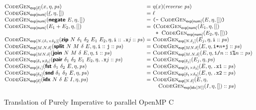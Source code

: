 \begin{figure}[H]
  \begin{minipage}{1.0\linewidth}
    \begin{displaymath}
      \begin{array}{@{}l@{~}c@{~}l@{}}
        \codegenExp{\delta}{x, \eta, \mathit{ps}}
        &=& \eta(x)(\mathit{reverse}~\mathit{ps})
        \\
        \codegenExp{\num}{\underline{\ell}, \eta, []}
        &=& \ell
        \\
        \codegenExp{\num}{\prim{negate}~E, \eta, []}
        &=& \texttt{(}\texttt{-}~\codegenExp{\num}{E, \eta, []}\texttt{)}
        \\
        \codegenExp{\num}{E_1 + E_2, \eta, []}
        &=& \texttt{(}
        \begin{array}[t]{@{}l}
          \codegenExp{\num}{E_1, \eta, []}\\
          \texttt{+ }\codegenExp{\num}{E_2, \eta, []}\texttt{)}
        \end{array}
        \\
        \codegenExp{N.(\delta_1 \times \delta_2)}{\prim{zip}~N~\delta_1~\delta_2~E_1~E_2, \eta, \texttt{i} :: \texttt{.x}j :: \mathit{ps}}
        &=& \codegenExp{N.\delta_j}{E_j, \eta, \texttt{i} :: \mathit{ps}}
        \\
        \codegenExp{M.N.\delta}{\prim{split}~N~M~\delta~E, \eta, \texttt{i} :: \texttt{j} :: \mathit{ps}}
        &=& \codegenExp{MN.\delta}{E, \eta, \texttt{i*}n\texttt{+j} :: \mathit{ps}}
        \\
        \codegenExp{MN.\delta}{\prim{join}~N~M~\delta~E, \eta, \texttt{i} :: \mathit{ps}}
        &=& \codegenExp{M.N.\delta}{E, \eta, \texttt{i/}n :: \texttt{i\%}n :: \mathit{ps}}
        \\
        \codegenExp{\delta_1 \times \delta_2}{\prim{pair}~\delta_1~\delta_2~E_1~E_2, \eta, \texttt{.x}j :: \mathit{ps}}
        &=& \codegenExp{\delta_j}{E_j, \eta, \mathit{ps}}
        \\
        \codegenExp{\delta_1}{\prim{fst}~\delta_1~\delta_2~E, \eta, \mathit{ps}}
        &=& \codegenExp{\delta_1 \times \delta_2}{E, \eta, \texttt{.x1} :: \mathit{ps}}
        \\
        \codegenExp{\delta_2}{\prim{snd}~\delta_1~\delta_2~E, \eta, \mathit{ps}}
        &=& \codegenExp{\delta_1 \times \delta_2}{E, \eta, \texttt{.x2} :: \mathit{ps}}
        \\
        \codegenExp{\delta}{\prim{idx}~N~\delta~E~I, \eta, \mathit{ps}}
        &=&
        \begin{array}[t]{@{}l}
          \textsc{CodeGen}_{\mathsf{exp}[N.\delta]}(E, \eta,\\ \quad\codegenExp{\mathsf{idx}[N]}{I, \eta, []} :: \mathit{ps})
        \end{array}
      \end{array}
    \end{displaymath}
    \label{fig:codegen-exp}
  \end{minipage}

  \caption{Translation of Purely Imperative \DPIA to parallel OpenMP C}
  \label{fig:codegen}
\end{figure}
